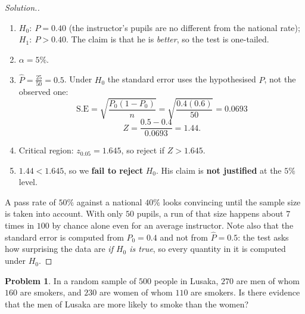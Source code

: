\documentclass[11pt,a4paper]{article}
\theoremstyle{definition}
\newtheorem{problemx}{Problem}[section]
\newenvironment{problem}{\begin{problemx}}{\end{problemx}}
\newenvironment{solution}
  {\renewcommand{\qedsymbol}{}\begin{proof}[\textit{Solution}.]}
  {\end{proof}}
\begin{document}
\begin{solution}
\begin{enumerate}
\item $H_0:\ P=0.40$ (the instructor's pupils are no different from the national rate);
$H_1:\ P>0.40$. The claim is that he is \emph{better}, so the test is one-tailed.
\item $\alpha=5\%$.
\item $\hat{P}=\frac{25}{50}=0.5$. Under $H_0$ the standard error uses the hypothesised
$P$, not the observed one:
\[\text{S.E}=\sqrt{\frac{P_0(1-P_0)}{n}}=\sqrt{\frac{0.4(0.6)}{50}}=0.0693\]
\[Z=\frac{0.5-0.4}{0.0693}=1.44.\]
\item Critical region: $z_{0.05}=1.645$, so reject if $Z>1.645$.
\item $1.44<1.645$, so we \textbf{fail to reject} $H_0$. His claim is \textbf{not justified}
at the $5\%$ level.
\end{enumerate}

A pass rate of $50\%$ against a national $40\%$ looks convincing until the sample size is
taken into account. With only $50$ pupils, a run of that size happens about $7$ times in
$100$ by chance alone even for an average instructor. Note also that the standard error is
computed from $P_0=0.4$ and not from $\hat{P}=0.5$: the test asks how surprising the data
are \emph{if $H_0$ is true}, so every quantity in it is computed under $H_0$.
\end{solution}

\begin{problem}
In a random sample of $500$ people in Lusaka, $270$ are men of whom $160$ are smokers, and
$230$ are women of whom $110$ are smokers. Is there evidence that the men of Lusaka are more
likely to smoke than the women?
\end{problem}
\end{document}
